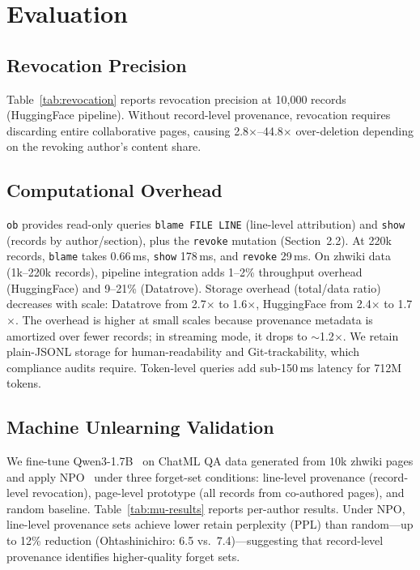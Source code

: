 \section{Evaluation}
\label{sec:evaluation}

\subsection{Revocation Precision}

Table~\ref{tab:revocation} reports revocation precision at 10,000 records (HuggingFace pipeline). Without record-level provenance, revocation requires discarding entire collaborative pages, causing 2.8$\times$--44.8$\times$ over-deletion depending on the revoking author's content share.



\subsection{Computational Overhead}

\texttt{ob} provides read-only queries \texttt{blame FILE LINE} (line-level attribution) and \texttt{show} (records by author/section), plus the \texttt{revoke} mutation (Section~2.2). At 220k records, \texttt{blame} takes 0.66\,ms, \texttt{show} 178\,ms, and \texttt{revoke} 29\,ms. On zhwiki data (1k--220k records), pipeline integration adds 1--2\% throughput overhead (HuggingFace) and 9--21\% (Datatrove). Storage overhead (total/data ratio) decreases with scale: Datatrove from 2.7$\times$ to 1.6$\times$, HuggingFace from 2.4$\times$ to 1.7$\times$. The overhead is higher at small scales because provenance metadata is amortized over fewer records; in streaming mode, it drops to $\sim$1.2$\times$. We retain plain-JSONL storage for human-readability and Git-trackability, which compliance audits require. Token-level queries add sub-150\,ms latency for 712M tokens.

\subsection{Machine Unlearning Validation}

We fine-tune Qwen3-1.7B~\cite{qwen3_2025} on ChatML QA data generated from 10k zhwiki pages and apply NPO~\cite{zhang2024npo} under three forget-set conditions: line-level provenance (record-level revocation), page-level prototype (all records from co-authored pages), and random baseline. Table~\ref{tab:mu-results} reports per-author results. Under NPO, line-level provenance sets achieve lower retain perplexity (PPL) than random---up to 12\% reduction (Ohtashinichiro: 6.5 vs.\ 7.4)---suggesting that record-level provenance identifies higher-quality forget sets.

